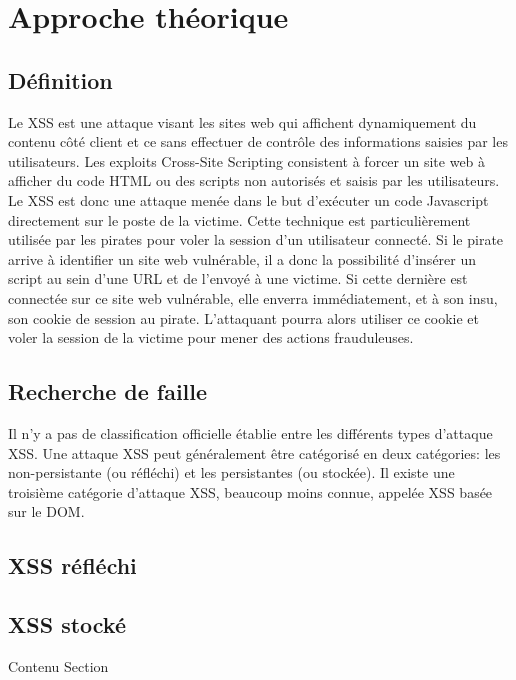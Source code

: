 \documentclass[a4paper,12pt]{report}
\begin{document}
    \newpage

  \chapter{Approche théorique} %
  \section{Définition}
Le XSS est une attaque visant les sites web qui affichent dynamiquement du contenu côté client et ce sans effectuer de contrôle des informations saisies par les utilisateurs. Les exploits Cross-Site Scripting consistent à forcer un site web à afficher du code HTML ou des scripts non autorisés et saisis par les utilisateurs. Le XSS est donc une attaque menée dans le but d'exécuter un code Javascript directement sur le poste de la victime. Cette technique est particulièrement utilisée par les pirates pour voler la session d'un utilisateur connecté.
Si le pirate arrive à identifier un site web vulnérable, il a donc la possibilité d’insérer un script au sein d’une URL et de l’envoyé à une victime. Si cette dernière est connectée sur ce site web vulnérable, elle enverra immédiatement, et à son insu, son cookie de session au pirate. L'attaquant pourra alors utiliser ce cookie et voler la session de la victime pour mener des actions frauduleuses.

    \newpage


  \section{Recherche de faille}



    \newpage

Il n'y a pas de classification officielle établie entre les différents types d'attaque XSS. Une attaque XSS peut généralement être catégorisé en deux catégories: les non-persistante (ou réfléchi) et les persistantes (ou stockée). Il existe une troisième catégorie d'attaque XSS, beaucoup moins connue, appelée XSS basée sur le DOM.

\section{XSS réfléchi}



    \newpage

\section{XSS stocké}
    Contenu Section
\end{document}
